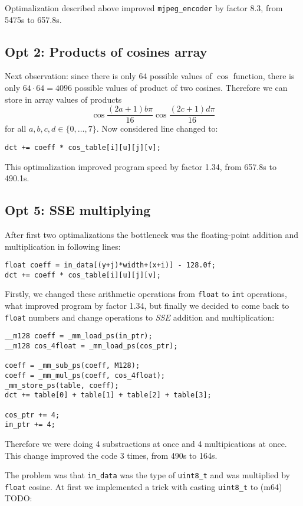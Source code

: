 \documentclass[11pt]{article}
\begin{document}
Optimalization described above improved \texttt{mjpeg\_encoder} by factor 8.3, from 5475s to 657.8s.

\subsection{Opt 2: Products of cosines array}
Next observation: since there is only 64 possible values of $\cos$ function,
there is only $64 \cdot 64 = 4096$ possible values of product of two cosines.
Therefore we can store in array values of products
$$\cos \frac{(2a + 1) b \pi}{16}
\cos \frac{(2c + 1) d \pi}{16}$$
for all $a, b, c, d \in \{0, \ldots, 7 \}$.
Now considered line changed to:
\begin{lstlisting}
dct += coeff * cos_table[i][u][j][v];
\end{lstlisting}
This optimalization improved program speed by factor 1.34, from 657.8s to 490.1s.

\subsection{Opt 5: SSE multiplying}
After first two optimalizations the bottleneck was the floating-point addition and multiplication in following lines:
\begin{lstlisting}
float coeff = in_data[(y+j)*width+(x+i)] - 128.0f;
dct += coeff * cos_table[i][u][j][v];
\end{lstlisting}
Firstly, we changed these arithmetic operations from \texttt{float} to \texttt{int} operations, what improved program by factor 1.34, 
but finally we decided to come back to \texttt{float} numbers and change operations to \emph{SSE} addition and multiplication:
\begin{lstlisting}
__m128 coeff = _mm_load_ps(in_ptr);
__m128 cos_4float = _mm_load_ps(cos_ptr);

coeff = _mm_sub_ps(coeff, M128);
coeff = _mm_mul_ps(coeff, cos_4float);
_mm_store_ps(table, coeff);
dct += table[0] + table[1] + table[2] + table[3];

cos_ptr += 4;
in_ptr += 4;
\end{lstlisting}
Therefore we were doing 4 substractions at once and 4 multipications at once.
This change improved the code 3 times, from 490s to 164s.

The problem was that \texttt{in\_data} was the type of \texttt{uint8\_t}
and was multiplied by \texttt{float} cosine.
At first we implemented a trick with casting \texttt{uint8\_t} to (m64) TODO:
\end{document}

